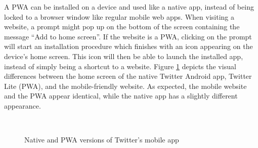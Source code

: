 \documentclass[a4paper,12pt]{article}
\begin{document}
A PWA can be installed on a device and used like a native app, instead of being locked to a browser window like regular mobile web apps. When visiting a website, a prompt might pop up on the bottom of the screen containing the message “Add to home screen”. If the website is a PWA, clicking on the prompt will start an installation procedure which finishes with an icon appearing on the device’s home screen. This icon will then be able to launch the installed app, instead of simply being a shortcut to a website. Figure \ref{fig:twitter_pwa} depicts the visual differences between the home screen of the native Twitter Android app, Twitter Lite (PWA), and the mobile-friendly website. As expected, the mobile website and the PWA appear identical, while the native app has a slightly different appearance.

\begin{figure}[h]%
	\centering
	$\,$
	$\,$
	\caption{Native and PWA versions of Twitter's mobile app}%
	\label{fig:twitter_pwa}%
\end{figure}
\end{document}
